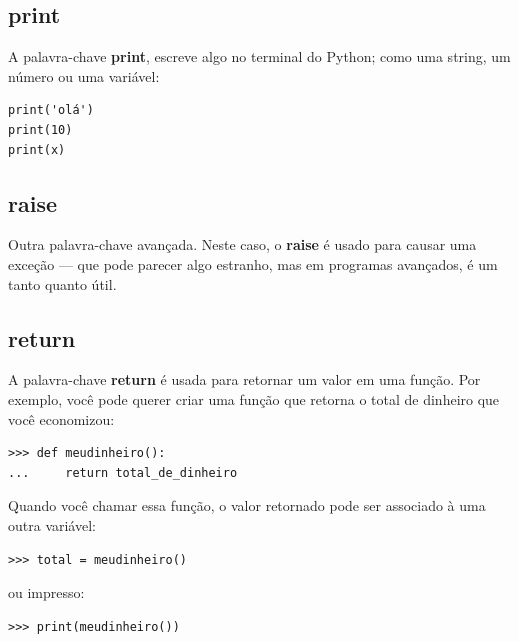 \subsection*{print}

A palavra-chave \textbf{print}, escreve algo no terminal do Python; como uma string, um número ou uma variável:

\begin{listing}
\begin{verbatim}
print('olá')
print(10)
print(x)
\end{verbatim}
\end{listing}

\subsection*{raise}

Outra palavra-chave avançada. Neste caso, o \textbf{raise} é usado para causar uma exceção --- que pode parecer algo estranho, mas em programas avançados, é um tanto quanto útil.

\subsection*{return}

A palavra-chave \textbf{return} é usada para retornar um valor em uma função. Por exemplo, você pode querer criar uma função que retorna o total de dinheiro que você economizou:

\begin{listingignore}
\begin{verbatim}
>>> def meudinheiro():
...     return total_de_dinheiro
\end{verbatim}
\end{listingignore}

\noindent
Quando você chamar essa função, o valor retornado pode ser associado à uma outra variável:

\begin{listingignore}
\begin{verbatim}
>>> total = meudinheiro()
\end{verbatim}
\end{listingignore}

\noindent
ou impresso:

\begin{listingignore}
\begin{verbatim}
>>> print(meudinheiro())
\end{verbatim}
\end{listingignore}

